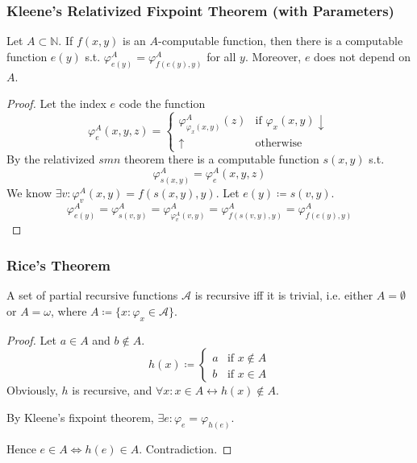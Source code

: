 \documentclass[UTF8,aspectratio=43,11pt,colorlinks,compress,openany]{beamer}%
\begin{document}
\begin{frame}\frametitle{Kleene's Relativized Fixpoint Theorem (with Parameters)}
\setlength\abovedisplayskip{0pt}
\setlength\belowdisplayskip{0pt}
\begin{theorem}
Let $A\subset\mathbb{N}$. If $f(x,y)$ is an $A$-computable function, then there is a computable function $e(y)$ s.t. $\varphi_{e(y)}^A=\varphi_{f(e(y),y)}^A$ for all $y$. Moreover, $e$ does not depend on $A$.
\end{theorem}
\begin{proof}
Let the index $e$ code the function
\[\varphi_e^A(x,y,z)=
\begin{cases}
\varphi_{\varphi_x(x,y)}^A(z) &\mbox{if } \varphi_x(x,y)\downarrow\\
\uparrow &\mbox{otherwise}
\end{cases}
\]
By the relativized $smn$ theorem there is a computable function $s(x,y)$ s.t.
\[\varphi_{s(x,y)}^A=\varphi_e^A(x,y,z)\]
We know $\exists v: \varphi_v^A(x,y)=f(s(x,y),y)$. Let $e(y)\coloneqq s(v,y)$.
\[\varphi_{e(y)}^A=\varphi_{s(v,y)}^A=\varphi_{\varphi_v^A(v,y)}^A=\varphi_{f(s(v,y),y)}^A=\varphi_{f(e(y),y)}^A\]
\end{proof}
\end{frame}

\begin{frame}\frametitle{Rice's Theorem}
	\begin{theorem}
		A set of partial recursive functions $\mathcal{A}$ is recursive iff it is trivial, i.e. either $A=\emptyset$ or $A=\omega$, where $A\coloneqq \{x:\varphi_x\in\mathcal{A}\}$.
	\end{theorem}
	\begin{proof}
		Let $a\in A$ and $b\notin A$.
		\[h(x)\coloneqq \begin{cases}
		a &\mbox{if } x\notin A\\
		b &\mbox{if } x\in A
		\end{cases}\]
		Obviously, $h$ is recursive, and $\forall x: x\in A\leftrightarrow h(x)\notin A$.
		
		By Kleene's fixpoint theorem, $\exists e: \varphi_e=\varphi_{h(e)}$.
		
		Hence $e\in A\iff h(e)\in A$. Contradiction.
	\end{proof}
\end{frame}
\end{document}
